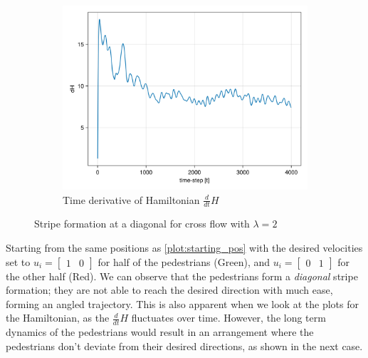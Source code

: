 \begin{itemize}
\begin{figure}[H]
\begin{subfigure}{.40\textwidth}
            \centering
            \includegraphics[width=\linewidth]{figures/dH_cross2.png}
            \caption{Time derivative of Hamiltonian $\frac{d}{dt}H$}
            \label{plot:cross2_dh}
        \end{subfigure}
        \caption{Stripe formation at a diagonal for cross flow with $\lambda = 2$}
        \label{plot:cross2}
    \end{figure}
Starting from the same positions as \autoref{plot:starting_pos} with the desired velocities set to $u_i = \begin{bmatrix} 1 & 0 \end{bmatrix}$ for half of the pedestrians (Green), and $u_i = \begin{bmatrix} 0 & 1 \end{bmatrix}$ for the other half (Red). We can observe that the pedestrians form a \textit{diagonal} stripe formation; they are not able to reach the desired direction with much ease, forming an angled trajectory. This is also apparent when we look at the plots for the Hamiltonian, as the $\frac{d}{dt}H$ fluctuates over time. However, the long term dynamics of the pedestrians would result in an arrangement where the pedestrians don't deviate from their desired directions, as shown in the next case.


\end{itemize}
